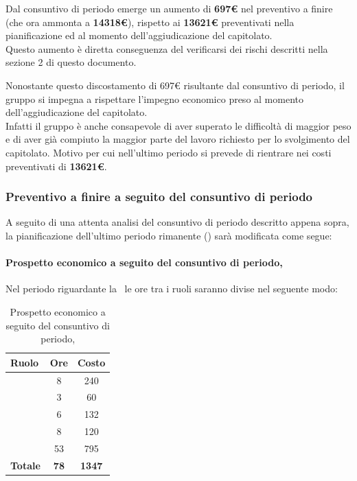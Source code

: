 Dal consuntivo di periodo emerge un aumento di \textbf{697€} nel preventivo a finire (che ora ammonta a \textbf{14318€}), rispetto ai \textbf{13621€} preventivati nella pianificazione ed al momento dell'aggiudicazione del capitolato.\\
Questo aumento è diretta conseguenza del verificarsi dei rischi descritti nella sezione 2 di questo documento.

Nonostante questo discostamento di 697€ risultante dal consuntivo di periodo, il gruppo si impegna a rispettare l'impegno economico preso al momento dell'aggiudicazione del capitolato.\\
Infatti il gruppo è anche consapevole di aver superato le difficoltà di maggior peso e di aver già compiuto la maggior parte del lavoro richiesto per lo svolgimento del capitolato. Motivo per cui nell'ultimo periodo si prevede di rientrare nei costi preventivati di \textbf{13621€}. \\

\subsubsection{Preventivo a finire a seguito del consuntivo di periodo}
A seguito di una attenta analisi del consuntivo di periodo descritto appena sopra, la pianificazione dell'ultimo periodo rimanente (\VV) sarà modificata come segue:

\paragraph{Prospetto economico a seguito del consuntivo di periodo, \VV}
Nel periodo riguardante la \VV\ le ore tra i ruoli saranno divise nel seguente modo:
\begin{table}[h]
	\begin{center}
		\begin{tabular}{|l|c|c|}
			\hline
			\textbf{Ruolo}	& \textbf{Ore} &	\textbf{Costo}	 \\
			\hline
			\textit{\Pm}	&	8	&	240		\\
			\hline
			\textit{\Am}	&	3	&	60		\\ 
			\hline
			\textit{\Prog}	&	6	&	132	\\
			\hline
			\textit{\Progr}	&	8	&	120	\\ 
			\hline
			\textit{\Ver}	&	53	&	795	\\
			\hline
			\textbf{Totale}	&	\textbf{78}	&	\textbf{1347}	\\
			\hline
						
		\end{tabular}
	\end{center}
	\caption{Prospetto economico a seguito del consuntivo di periodo, \VV}
\end{table}

